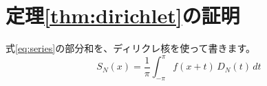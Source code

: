 \section{定理\ref{thm:dirichlet}の証明}\label{sec:proofs}
式\eqref{eq:series}の部分和を、ディリクレ核を使って書きます。
\[
  S_N(x) = \frac{1}{\pi}\int_{-\pi}^{\pi} f(x+t)\,D_N(t)\,dt
\]
